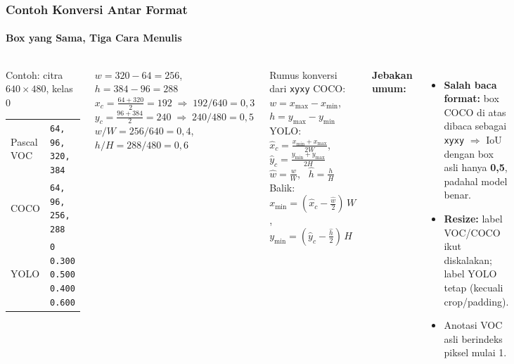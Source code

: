 \documentclass[t,aspectratio=169,xcolor=dvipsnames]{beamer}
\begin{document}
\begin{frame}
    \frametitle{Contoh Konversi Antar Format}
    \framesubtitle{Box yang Sama, Tiga Cara Menulis}
    \footnotesize

    \begin{columns}[T]
        \begin{exampleblock}{Contoh: citra $640\times480$, kelas 0}
            \begin{tabular}{@{}ll@{}}
                Pascal VOC & \texttt{64, 96, 320, 384} \\
                COCO & \texttt{64, 96, 256, 288} \\
                YOLO & \texttt{0 0.300 0.500 0.400 0.600} \\
            \end{tabular}
        \end{exampleblock}
        \vspace{0.1cm}
        $w = 320-64 = 256$, \quad $h = 384-96 = 288$\\[2pt]
        $x_c = \tfrac{64+320}{2} = 192 \;\Rightarrow\; 192/640 = 0{,}3$\\[2pt]
        $y_c = \tfrac{96+384}{2} = 240 \;\Rightarrow\; 240/480 = 0{,}5$\\[2pt]
        $w/W = 256/640 = 0{,}4$, \quad $h/H = 288/480 = 0{,}6$

        \begin{block}{Rumus konversi dari \texttt{xyxy}}
            COCO: $w=x_{\max}-x_{\min}$, \ $h=y_{\max}-y_{\min}$\\[2pt]
            YOLO: $\hat x_c=\tfrac{x_{\min}+x_{\max}}{2W}$, \ $\hat y_c=\tfrac{y_{\min}+y_{\max}}{2H}$\\[2pt]
            \phantom{YOLO:} $\hat w=\tfrac{w}{W}$, \ $\hat h=\tfrac{h}{H}$\\[2pt]
            Balik: $x_{\min}=(\hat x_c-\tfrac{\hat w}{2})\,W$, \ $y_{\min}=(\hat y_c-\tfrac{\hat h}{2})\,H$
        \end{block}
        \textbf{Jebakan umum:}
        \begin{itemize}
            \item \textbf{Salah baca format:} box COCO di atas dibaca sebagai \texttt{xyxy} $\Rightarrow$ IoU dengan box asli hanya \textbf{0,5}, padahal model benar.
            \item \textbf{Resize:} label VOC/COCO ikut diskalakan; label YOLO tetap (kecuali crop/padding).
            \item Anotasi VOC asli berindeks piksel mulai 1.
        \end{itemize}
    \end{columns}
\end{frame}
\end{document}
